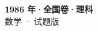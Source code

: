 \documentclass[zihao=-4, a4paper]{ctexart}
\begin{document}
\begin{center}
  {\Large\bfseries 1986 年·全国卷·理科}\\[4pt]
  {\large 数学 · 试题版}
\end{center}
\medskip
{}

\end{document}
